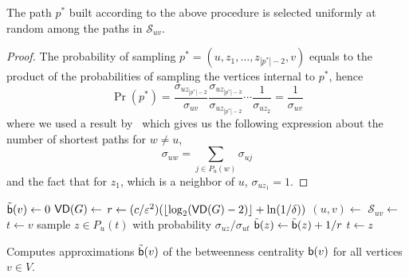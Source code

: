 \begin{lemma}\label{lem:samplpath}
  The path $p^*$ built according to the above procedure is selected uniformly at
  random among the paths in $\mathcal{S}_{uv}$.
\end{lemma}

\begin{proof}
  The probability of sampling $p^*=(u,z_1,\dotsc,z_{|p^*|-2},v)$ equals to the
  product of the probabilities of sampling the vertices internal to $p^*$, hence
  \[
  \Pr(p^*)=\frac{\sigma_{uz_{|p^*|-2}}}{\sigma_{uv}}\frac{\sigma_{uz_{|p^*|-3}}}{\sigma_{uz_{|p^*|-2}}}\dotsb
  \frac{1}{\sigma_{uz_2}}=\frac{1}{\sigma_{uv}}
  \]
  where we used a result by~\citet[Lemma 3]{Brandes01} which gives us the following expression 
  about the number of shortest paths for $w\neq u$,
  \[
  \sigma_{uw}=\sum_{j\in P_u(w)}\sigma_{uj}
  \]
  and the fact that for $z_1$, which is a neighbor of $u$, $\sigma_{uz_1}=1$.
\end{proof}

\begin{algorithm}[ht]
   \DontPrintSemicolon
  {
  $\tilde{\mathsf{b}}(v)\leftarrow 0$
  }
  $\mathsf{VD}(G)\leftarrow$\label{alg:diamcomp}\; 
  $r\leftarrow (c/\varepsilon^2)(\lfloor\log_2(\mathsf{VD}(G)-2)\rfloor+\ln(1/\delta))$\;
  {\label{algline:forloop}
  $(u,v)\leftarrow$\label{algline:samplevertices}\;
  $\mathcal{S}_{uv}\leftarrow$\label{algline:shortestpaths}\;
  {
  $t\leftarrow v$\;
   {
  sample $z\in P_u(t)$ with probability $\sigma_{uz}/\sigma_{ut}$\;
   {
  $\tilde{\mathsf{b}}(z) \leftarrow \tilde{\mathsf{b}}(z)+1/r$\;
  }
  $t\leftarrow z$\;
  }
  }
  } %
  \caption{Computes approximations $\tilde{\mathsf{b}}(v)$ of the betweenness
  centrality $\mathsf{b}(v)$ for all vertices $v\in V$.}
  \label{alg:algorithm}
\end{algorithm}

